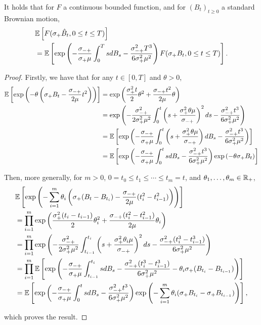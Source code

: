  \begin{proposition}
 \label{prop:characterizelimitprocess}
It holds that for $F$ a continuous bounded function, and for $(B_t)_{t\geq 0}$ a standard Brownian motion,
\begin{align*} &{\mathbb E}\left[F(\sigma_+ \hat{B}_t,0\leq t \leq T)\right]\\&={\mathbb E}\left[\exp\left(-\frac{\sigma_{-+}}{\sigma_+ \mu} \int_0^T s dB_s -\frac{\sigma_{-+}^2 T^3}{6\sigma_+^2 \mu^2}\right)F(\sigma_+ B_t,   0\leq t \leq T)\right].\end{align*}
 \end{proposition}
 \begin{proof}
 Firstly, we have that for any $t\in [0,T]$ and $\theta>0$,
 \begin{align*}
     {\mathbb E} \left[\exp\left(-\theta\left(\sigma_+ B_t - \frac{\sigma_{-+}}{2\mu} t^2\right)\right)\right]&=\exp\left(\frac{\sigma_+^2 t}{2}\theta^2+\frac{\sigma_{-+} t^2}{2\mu}\theta \right)\\
     &=\exp\left(-\frac{\sigma_{-+}^2}{2\sigma_+^2 \mu^2}\int_0^t \left(s+\frac{\sigma_+^2\theta \mu}{\sigma_{-+}}\right)^2 ds -\frac{\sigma_{-+}^2 t^3}{6\sigma_+^2\mu^2}\right)\\
     &={\mathbb E}\left[\exp \left( -\frac{\sigma_{-+}}{\sigma_+ \mu}\int_0^t \left(s+\frac{\sigma_+^2\theta \mu}{\sigma_{-+}}\right) dB_s -\frac{\sigma_{-+}^2 t^3}{6\sigma_+^2\mu^2}\right)\right]\\
     &={\mathbb E} \left[ \exp\left(-\frac{\sigma_{-+}}{\sigma_+ \mu}\int_0^t s dB_s-\frac{\sigma_{-+}^2 t^3}{6\sigma_+^2\mu^2}\right)\exp\left(-\theta\sigma_+ B_t  \right)\right]
 \end{align*}
 
 Then, more generally, for $m>0$, $0=t_0\leq t_1\leq \cdots \leq t_m=t$, and $\theta_1, \dots, \theta_m \in {\mathbb R}_+$, 
 \begin{align*}
     &{\mathbb E} \left[\exp\left(-\sum_{i=1}^m\theta_i\left(\sigma_+ (B_t-B_{t_i}) - \frac{\sigma_{-+}}{2\mu} (t_i^2-t_{i-1}^2)\right)\right)\right]\\
     &=\prod_{i=1}^m \exp\left(\frac{ \sigma_+^2 (t_i-t_{i-1}) }{2}\theta_i^2+\frac{\sigma_{-+} (t_i^2-t_{i-1}^2)}{2\mu}\theta_i \right)\\
     &= \prod_{i=1}^m  \exp\left( -\frac{\sigma_{-+}^2}{2\sigma_+^2 \mu^2}\int_{t_{i-1}}^{t_i}\left(s+\frac{\sigma_+^2\theta_i\mu}{\sigma_{-+}}\right)^2 ds - \frac{\sigma_{-+}^2 (t_i^3-t_{i-1}^3)}{6\sigma_+^2 \mu^2} \right)\\
     &= \prod_{i=1}^m {\mathbb E}\left[\exp\left(-\frac{\sigma_{-+}}{\sigma_+\mu} \int _{t_{i-1}}^{t_i} s dB_s-\frac{\sigma_{-+}^2 (t_i^3-t_{i-1}^3)}{6\sigma_+^2 \mu^2}-\theta_i \sigma_+  (B_{t_i}-B_{t_{i-1}})\right)\right]\\
     &= {\mathbb E}\left[\exp\left(-\frac{\sigma_{-+}}{\sigma_+ \mu}\int_0^t s dB_s-\frac{\sigma_{-+}^2 t^3}{6\sigma_+^2\mu^2} \right) \exp\left(-\sum_{i=1}^m \theta_i(\sigma_+{B}_{t_i}-\sigma_+{B}_{t_{i-1}})\right)\right],
 \end{align*}
 
 which proves the result.
 \end{proof}

